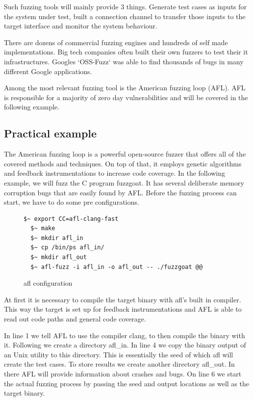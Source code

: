 \documentclass[journal=tosc,final]{iacrtrans}
\begin{document}
Such fuzzing tools will mainly provide 3 things. Generate test cases as inputs for the system under test, built a connection channel to transfer those inputs to the target interface and monitor the system behaviour.

There are dozens of commercial fuzzing engines and hundreds of self made implementations. Big tech companies often built their own fuzzers to test their it infrastructures. Googles `OSS-Fuzz` was able to find thousands of bugs in many different Google applications. 

Among the most relevant fuzzing tool is the American fuzzing loop (AFL).
AFL is responsible for a majority of zero day vulnerabilities and will be covered in the following example.
\subsection{Practical example}
The American fuzzing loop is a powerful open-source fuzzer that offers all of the covered methods and techniques. On top of that, it employs genetic algorithms and feedback instrumentations to increase code coverage. In the following example, we will fuzz the C program fuzzgoat. It has several deliberate memory corruption bugs that are easily found by AFL. Before the fuzzing process can start, we have to do some pre configurations. 
\begin{figure}[h]
 \caption{afl configuration}
 \begin{lstlisting}[style=code]
  $~ export CC=afl-clang-fast
  $~ make
  $~ mkdir afl_in
  $~ cp /bin/ps afl_in/   
  $~ mkdir afl_out
  $~ afl-fuzz -i afl_in -o afl_out -- ./fuzzgoat @@
\end{lstlisting}
\end{figure}

At first it is necessary to compile the target binary with afl's built in compiler. This way the target is set up for feedback instrumentations and AFL is able to read out code paths and general code coverage.

In line 1 we tell AFL to use the compiler clang, to then compile the binary with it.
Following we create a directory afl\_in. In line 4 we copy the binary output of an Unix utility to this directory. This is essentially the seed of which afl will create the test cases. To store results we create another directory afl\_out. In there AFL will provide information about crashes and bugs. 
On line 6 we start the actual fuzzing process by passing the seed and output locations as well as the target binary. 
\end{document}

